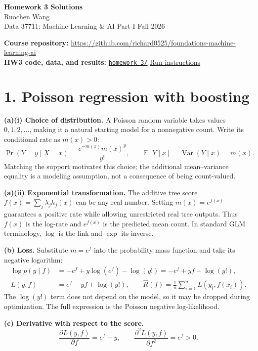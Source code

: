 \documentclass[10pt,letterpaper]{article}
\newcommand{\E}{\mathbb E}
\begin{document}
\begin{center}
{\LARGE\bfseries Homework 3 Solutions}\\[6pt]
{\large Ruochen Wang}\\[3pt]
Data 37711: Machine Learning \& AI Part I \quad Fall 2026
\end{center}
\textbf{Course repository:} \url{https://github.com/richard0525/foundations-machine-learning-ai}\\
\textbf{HW3 code, data, and results:} \href{https://github.com/richard0525/foundations-machine-learning-ai/tree/main/homework_3}{\texttt{homework\_3/}} \quad
\href{https://github.com/richard0525/foundations-machine-learning-ai/blob/main/homework_3/README.md}{Run instructions}

\section*{1. Poisson regression with boosting}
\textbf{(a)(i) Choice of distribution.}
A Poisson random variable takes values $0,1,2,\ldots$, making it a natural starting model for a nonnegative count. Write its conditional rate as $m(x)>0$:
\[
\Pr(Y=y\mid X=x)=\frac{e^{-m(x)}m(x)^y}{y!},\qquad
\E[Y\mid x]=\operatorname{Var}(Y\mid x)=m(x).
\]
Matching the support motivates this choice; the additional mean--variance equality is a modeling assumption, not a consequence of being count-valued.

\textbf{(a)(ii) Exponential transformation.}
The additive tree score $f(x)=\sum_j\lambda_jh_j(x)$ can be any real number. Setting $m(x)=e^{f(x)}$ guarantees a positive rate while allowing unrestricted real tree outputs. Thus $f(x)$ is the log-rate and $e^{f(x)}$ is the predicted mean count. In standard GLM terminology, $\log$ is the link and $\exp$ its inverse.

\textbf{(b) Loss.}
Substitute $m=e^f$ into the probability mass function and take its negative logarithm:
\begin{align*}
\log p(y\mid f)&=-e^f+y\log(e^f)-\log(y!)=-e^f+yf-\log(y!),\\
L(y,f)&=\boxed{e^f-yf+\log(y!)},\qquad
\widehat R(f)=\frac1n\sum_{i=1}^n L(y_i,f(x_i)).
\end{align*}
The $\log(y!)$ term does not depend on the model, so it may be dropped during optimization. The full expression is the Poisson negative log-likelihood.

\textbf{(c) Derivative with respect to the score.}
\[
\boxed{\frac{\partial L(y,f)}{\partial f}=e^f-y},\qquad
\frac{\partial^2L(y,f)}{\partial f^2}=e^f>0.
\]
\end{document}
